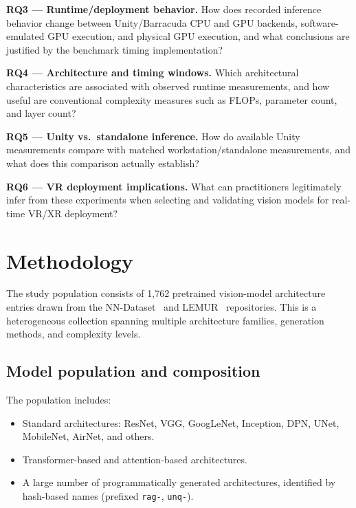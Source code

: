 \documentclass[10pt,twocolumn]{article}
\begin{document}
\noindent\textbf{RQ3 --- Runtime/deployment behavior.}
How does recorded inference behavior change between Unity/Barracuda CPU and GPU backends, software-emulated GPU execution, and physical GPU execution, and what conclusions are justified by the benchmark timing implementation?

\noindent\textbf{RQ4 --- Architecture and timing windows.}
Which architectural characteristics are associated with observed runtime measurements, and how useful are conventional complexity measures such as FLOPs, parameter count, and layer count?

\noindent\textbf{RQ5 --- Unity vs.\ standalone inference.}
How do available Unity measurements compare with matched workstation/standalone measurements, and what does this comparison actually establish?

\noindent\textbf{RQ6 --- VR deployment implications.}
What can practitioners legitimately infer from these experiments when selecting and validating vision models for real-time VR/XR deployment?

\section{Methodology}\label{sec:population}

The study population consists of 1,762 pretrained vision-model architecture entries drawn from the NN-Dataset~\cite{ABrain.NN-Dataset} and LEMUR~\cite{ABrain.LEMUR2} repositories. This is a heterogeneous collection spanning multiple architecture families, generation methods, and complexity levels.

\subsection{Model population and composition}

The population includes:
\begin{itemize}[nosep,leftmargin=*]
  \item Standard architectures: ResNet, VGG, GoogLeNet, Inception, DPN, UNet, MobileNet, AirNet, and others.
  \item Transformer-based and attention-based architectures.
  \item A large number of programmatically generated architectures, identified by hash-based names (prefixed \texttt{rag-}, \texttt{unq-}).
\end{itemize}
\end{document}
